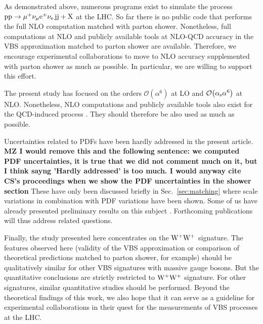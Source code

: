 As demonstrated above, numerous programs exist to simulate the process $\text{p}\text{p}\to\mu^+\nu_\mu{\rm e}^+\nu_{\rm e}\,\text{j}\text{j}+\mathrm{X}$ at the LHC.
So far there is no public code that performs the full NLO computation matched with parton shower.
Nonetheless, full computations at NLO and publicly available tools at NLO-QCD accuracy in the VBS approximation matched to parton shower are available.
Therefore, we encourage experimental collaborations to move to NLO accuracy supplemented with parton shower as much as possible.
In particular, we are willing to support this effort. 

The present study has focused on the orders $\mathcal{O}{\left(\alpha^{6}\right)}$ at LO and $\mathcal{O}{\left(\alpha_\text{s}\alpha^{6}\right)}$ at NLO.
Nonetheless, NLO computations and publicly available tools also exist for the QCD-induced process \cite{Rauch:2016pai,Melia:2010bm,Melia:2011gk,Campanario:2013gea,Baglio:2014uba,Biedermann:2017bss}.
They should therefore be also used as much as possible.

Uncertainties related to PDFs have been hardly addressed in the present article.
{\bf MZ I would remove this and the following sentence: we computed PDF uncertainties,
    it is true that we did not comment much on it, but I think sayng 'Hardly addressed' is too much. I would anyway cite CS's proceedings when we
show the PDF uncertainties in the shower section}
These have only been discussed briefly in Sec.~\ref{sec:matching} where scale variations in combination with PDF variations have been shown.
Some of us have already presented preliminary results on this subject \cite{Schwan:2017yy}. %
Forthcoming publications will thus address related questions.

Finally, the study presented here concentrates on the ${\rm W}^+{\rm W}^+$ signature.
The features observed here (validity of the VBS approximation or comparison of theoretical predictions matched to parton shower, for example) should be qualitatively similar for other VBS signatures with massive gauge bosons. 
But the quantitative conclusions are strictly restricted to ${\rm W}^+{\rm W}^+$ signature.
For other signatures, similar quantitative studies should be performed.
Beyond the theoretical findings of this work, we also hope that it can serve as a guideline for experimental collaborations in their quest for the measurements of VBS processes at the LHC.
